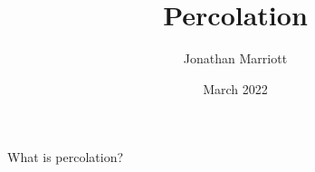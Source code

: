 \documentclass{beamer}
\title[Percolation]{Percolation}
\subtitle{}
\author[Jonathan Marriott]{Jonathan Marriott}
\date{March 2022}
\begin{document}
    \begin{frame}[plain]
        \maketitle
    \end{frame}


    \begin{frame}{What is percolation?}
        
    \end{frame}
\end{document}
